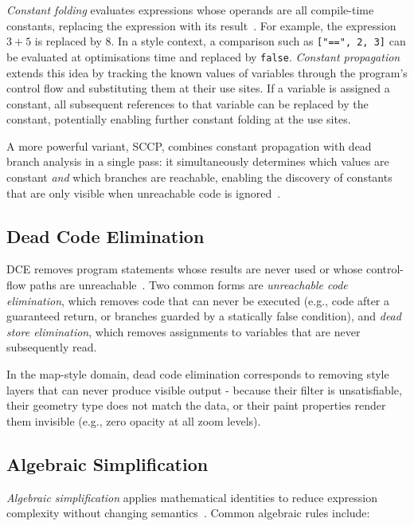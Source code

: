 \emph{Constant folding} evaluates expressions whose operands are all compile-time constants, replacing the expression with its result~\cite{ahoCompilersPrinciplesTechniques2007}.
For example, the expression $3 + 5$ is replaced by $8$.
In a style context, a comparison such as \texttt{["==",~2,~3]} can be evaluated at optimisations time and replaced by \texttt{false}.
\emph{Constant propagation} extends this idea by tracking the known values of variables through the program's control flow and substituting them at their use sites.
If a variable is assigned a constant, all subsequent references to that variable can be replaced by the constant, potentially enabling further constant folding at the use sites.

A more powerful variant, \acf{SCCP}, combines constant propagation with dead branch analysis in a single pass: it simultaneously determines which values are constant \emph{and} which branches are reachable, enabling the discovery of constants that are only visible when unreachable code is ignored~\cite{wegmanConstantPropagationConditional1991}.

\subsection{Dead Code Elimination}

\acf{DCE} removes program statements whose results are never used or whose control-flow paths are unreachable~\cite{ahoCompilersPrinciplesTechniques2007}.
Two common forms are \emph{unreachable code elimination}, which removes code that can never be executed (e.g., code after a guaranteed return, or branches guarded by a statically false condition), and \emph{dead store elimination}, which removes assignments to variables that are never subsequently read.

In the map-style domain, dead code elimination corresponds to removing style layers that can never produce visible output - because their filter is unsatisfiable, their geometry type does not match the data, or their paint properties render them invisible (e.g., zero opacity at all zoom levels).

\subsection{Algebraic Simplification}

\emph{Algebraic simplification} applies mathematical identities to reduce expression complexity without changing semantics~\cite{ahoCompilersPrinciplesTechniques2007}.
Common algebraic rules include:

